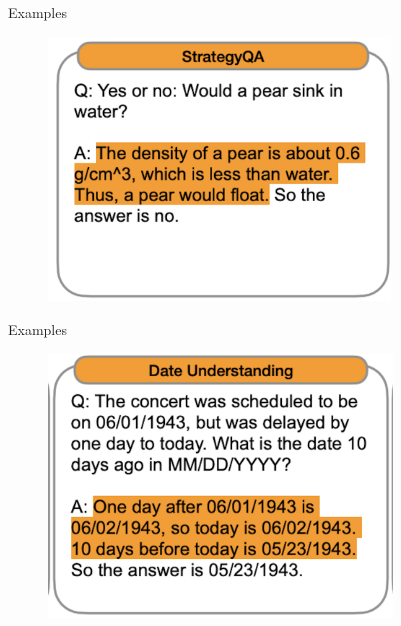 \begin{vbframe}{Examples}

\vfill

\begin{figure}
    \centering
    \includegraphics[height=7cm]{figure/cotex1.png}
\end{figure}

\vfill

\end{vbframe}

\begin{vbframe}{Examples}

\vfill

\begin{figure}
    \centering
    \includegraphics[height=7cm]{figure/cotex2.png}
\end{figure}

\vfill

\end{vbframe}

